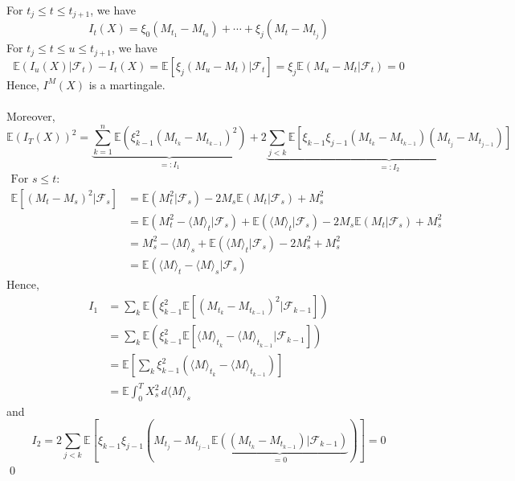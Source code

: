 \documentclass[12pt,a4paper]{article}
\newcommand{\E}{\mathbb{E}}
\renewenvironment{proof}
    {\begin{trivlist}\item[\hskip\labelsep\color{blue}\bfseries Proof:]}
    {\qed\end{trivlist}}
\begin{document}
\begin{proof}
    For $t_j\le t\le t_{j+1}$, we have
    $$
    I_t(X) = \xi_0(M_{t_1}-M_{t_0})+\cdots+\xi_{j}(M_{t}-M_{t_j}) 
    $$
    For $t_j\le t\le u\le t_{j+1}$, we have
    $$
    \E(I_u(X)|\mathscr{F}_t)-I_t(X) = \E[\xi_j(M_u-M_t)|\mathscr{F}_t] = \xi_j\E(M_u-M_t|\mathscr{F}_t)=0
    $$
    Hence, $I^M(X)$ is a martingale.\\
    \\
    Moreover,
    $$
    \E(I_T(X))^2 = \underbrace{\sum_{k=1}^n\E(\xi_{k-1}^2(M_{t_k}-M_{t_{k-1}})^2)}_{=:I_1}+2\underbrace{\sum_{j<k}\E[\xi_{k-1}\xi_{j-1}(M_{t_k}-M_{t_{k-1}})(M_{t_j}-M_{t_{j-1}})]}_{=:I_2}
    $$
\begin{equation*}
\boxed{
\begin{aligned}
\text{For }s\le t:\\[1ex]
\E[(M_t-M_s)^2|\mathscr{F}_s]&= \E(M_t^2|\mathscr{F}_s) -2M_s\E(M_t|\mathscr{F}_s) + M_s^2\\
&= \E(M_t^2-\langle M\rangle_t|\mathscr{F}_s) +\E(\langle M\rangle_t|\mathscr{F}_s)-2M_s\E(M_t|\mathscr{F}_s) + M_s^2\\
&= M_s^2-\langle M\rangle_s +\E(\langle M\rangle_t|\mathscr{F}_s)-2M_s^2 +M_s^2\\
&=\E(\langle M\rangle_t-\langle M\rangle_s|\mathscr{F}_s)
\end{aligned}
}
\end{equation*}
Hence, 
\begin{align*}
    I_1 &= \sum_k \E(\xi_{k-1}^2\E[(M_{t_k}-M_{t_{k-1}})^2|\mathscr{F}_{k-1}])\\
    &= \sum_k \E(\xi_{k-1}^2\E[\langle M\rangle_{t_k}-\langle M\rangle_{t_{k-1}}|\mathscr{F}_{k-1}])\\
    &= \E\left[\sum_k \xi_{k-1}^2 \left(\langle M\rangle_{t_k}-\langle M\rangle_{t_{k-1}}\right)\right]\\
    &= \E\int_0^T X_s^2\, d\langle M\rangle_s
\end{align*}
and
$$
I_2=2\sum_{j<k}\E[\xi_{k-1}\xi_{j-1}(M_{t_j}-M_{t_{j-1}}\underbrace{\E((M_{t_k}-M_{t_{k-1}})|\mathscr{F}_{k-1})}_{=0})]=0
$$
\end{proof}
\pagebreak
\end{document}
